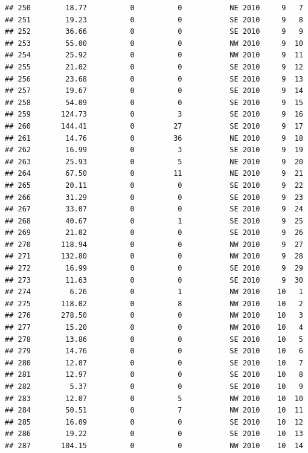 \documentclass[
]{article}
\begin{document}
\begin{verbatim}
## 250        18.77          0          0           NE 2010     9   7
## 251        19.23          0          0           SE 2010     9   8
## 252        36.66          0          0           SE 2010     9   9
## 253        55.00          0          0           NW 2010     9  10
## 254        25.92          0          0           NW 2010     9  11
## 255        21.02          0          0           SE 2010     9  12
## 256        23.68          0          0           SE 2010     9  13
## 257        19.67          0          0           SE 2010     9  14
## 258        54.09          0          0           SE 2010     9  15
## 259       124.73          0          3           SE 2010     9  16
## 260       144.41          0         27           SE 2010     9  17
## 261        14.76          0         36           NE 2010     9  18
## 262        16.99          0          3           SE 2010     9  19
## 263        25.93          0          5           NE 2010     9  20
## 264        67.50          0         11           NE 2010     9  21
## 265        20.11          0          0           SE 2010     9  22
## 266        31.29          0          0           SE 2010     9  23
## 267        33.07          0          0           SE 2010     9  24
## 268        40.67          0          1           SE 2010     9  25
## 269        21.02          0          0           SE 2010     9  26
## 270       118.94          0          0           NW 2010     9  27
## 271       132.80          0          0           NW 2010     9  28
## 272        16.99          0          0           SE 2010     9  29
## 273        11.63          0          0           SE 2010     9  30
## 274         6.26          0          1           NW 2010    10   1
## 275       118.02          0          8           NW 2010    10   2
## 276       278.50          0          0           NW 2010    10   3
## 277        15.20          0          0           NW 2010    10   4
## 278        13.86          0          0           SE 2010    10   5
## 279        14.76          0          0           SE 2010    10   6
## 280        12.07          0          0           SE 2010    10   7
## 281        12.97          0          0           SE 2010    10   8
## 282         5.37          0          0           SE 2010    10   9
## 283        12.07          0          5           NW 2010    10  10
## 284        50.51          0          7           NW 2010    10  11
## 285        16.09          0          0           SE 2010    10  12
## 286        19.22          0          0           SE 2010    10  13
## 287       104.15          0          0           NW 2010    10  14

\end{verbatim}
\end{document}

